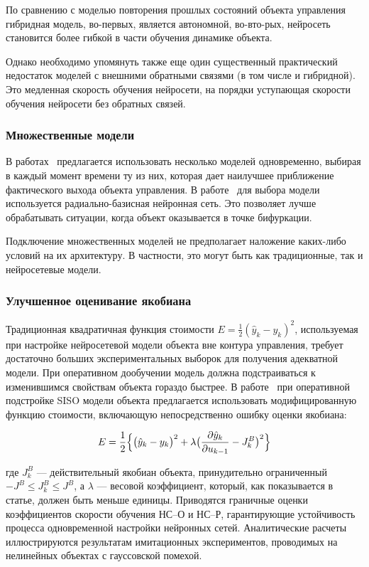 По сравнению с моделью повторения прошлых состояний объекта управления
гибридная модель, во-первых, является автономной, во-{вто-рых}, нейросеть
становится более гибкой в части обучения динамике объекта.

Однако необходимо упомянуть также еще один существенный практический
недостаток моделей с внешними обратными связями (в том числе и
гибридной).  Это медленная скорость обучения нейросети, на порядки
уступающая скорости обучения нейросети без обратных связей.

\subsubsection{Множественные модели}

В работах~\cite{narmuk96}\cite{ronco98} предлагается использовать
несколько моделей одновременно, выбирая в каждый момент времени ту из
них, которая дает наилучшее приближение фактического выхода объекта
управления.  В работе~\cite{ronco98} для выбора модели используется
радиально-базисная нейронная сеть.  Это позволяет лучше обрабатывать
ситуации, когда объект оказывается в точке бифуркации.

Подключение множественных моделей не предполагает наложение каких-либо
условий на их архитектуру.  В частности, это могут быть как
традиционные, так и нейросетевые модели.

\subsubsection{Улучшенное оценивание якобиана}

Традиционная квадратичная функция стоимости $E=\frac{1}{2}(\hat{y}_k -
y_k)^2$, используемая при настройке нейросетевой модели объекта вне
контура управления, требует достаточно больших экспериментальных
выборок для получения адекватной модели.  При оперативном дообучении
модель должна подстраиваться к изменившимся свойствам объекта гораздо
быстрее.  В работе~\cite{wangbao00} при оперативной подстройке SISO
модели объекта предлагается использовать модифицированную функцию
стоимости, включающую непосредственно ошибку оценки якобиана:

$$
E=\frac{1}{2}\Bigl\{\bigl(\hat{y}_k - y_k\bigr)^2 +
  \lambda\bigl(\frac{\partial\hat{y}_k}{\partial u_{k-1}} -
  J^B_k\bigr)^2\Bigr\}
$$

\noindent где $J^B_k$ --- действительный якобиан объекта, принудительно
ограниченный $-J^B\le J^B_k\le J^B$, а $\lambda$ --- весовой
коэффициент, который, как показывается в статье, должен быть меньше
единицы.  Приводятся граничные оценки коэффициентов скорости обучения
НС--О и НС--Р, гарантирующие устойчивость процесса одновременной
настройки нейронных сетей.  Аналитические расчеты иллюстрируются
результатам имитационных экспериментов, проводимых на нелинейных
объектах с гауссовской помехой.


